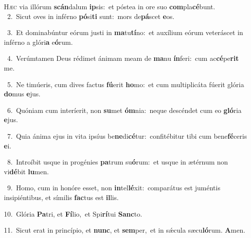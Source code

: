 \lettrine{\initial\textcolor{\initialcolor}{H}}{æc} via illórum \textbf{scán}\-dalum \textbf{ip}\-sis:~\star et póstea in ore suo \textbf{com}\-pla\-\textbf{cé}\-bunt.\\
{\numbfont\textcolor{\numbcolor}{~2.}}~Sicut oves in inférno \textbf{pó}\-si\textbf{ti} sunt:~\star mors de\-\textbf{pá}\-scet \textbf{e}\-os.\par
{\numbfont\textcolor{\numbcolor}{~3.}}~Et dominabúntur eórum justi in \textbf{ma}\-tu\-\textbf{tí}\-no:~\star et auxílium eórum veteráscet in inférno a glóri\textbf{a} e\-\textbf{ó}\-rum.\par
{\numbfont\textcolor{\numbcolor}{~4.}}~Verúmtamen Deus rédimet ánimam meam de \textbf{ma}\-nu \textbf{ín}\-feri:~\star cum ac\-\textbf{cé}\-pe\textbf{rit} me.\par
{\numbfont\textcolor{\numbcolor}{~5.}}~Ne timúeris, cum dives factus \textbf{fú}\-erit \textbf{ho}\-mo:~\star et cum multiplicáta fúerit glória \textbf{do}\-mus \textbf{e}\-jus.\par
{\numbfont\textcolor{\numbcolor}{~6.}}~Quóniam cum interíerit, non \textbf{su}\-met \textbf{óm}\-nia:~\star neque descéndet cum eo \textbf{gló}\-ria \textbf{e}\-jus.\par
{\numbfont\textcolor{\numbcolor}{~7.}}~Quia ánima ejus in vita ipsíus be\-\textbf{ne}\-di\-\textbf{cé}\-tur:~\star confitébitur tibi cum bene\-\textbf{fé}\-ceris \textbf{e}\-i.\par
{\numbfont\textcolor{\numbcolor}{~8.}}~Introíbit usque in progénies \textbf{pa}\-trum su\-\textbf{ó}\-rum:~\star et usque in ætérnum non vi\-\textbf{dé}\-bit \textbf{lu}\-men.\par
{\numbfont\textcolor{\numbcolor}{~9.}}~Homo, cum in honóre esset, non \textbf{in}\-tel\-\textbf{lé}\-xit:~\star comparátus est juméntis insipiéntibus, et símilis \textbf{fac}\-tus est \textbf{il}\-lis.\par
{\numbfont\textcolor{\numbcolor}{10.}}~Glória \textbf{Pa}\-tri, et \textbf{Fí}\-lio,~\star et Spi\-\textbf{rí}\-tui \textbf{Sanc}\-to.\par
{\numbfont\textcolor{\numbcolor}{11.}}~Sicut erat in princípio, et \textbf{nunc}\-, et \textbf{sem}\-per,~\star et in sǽcula sæcu\-\textbf{ló}\-rum. \textbf{A}\-men.\par
